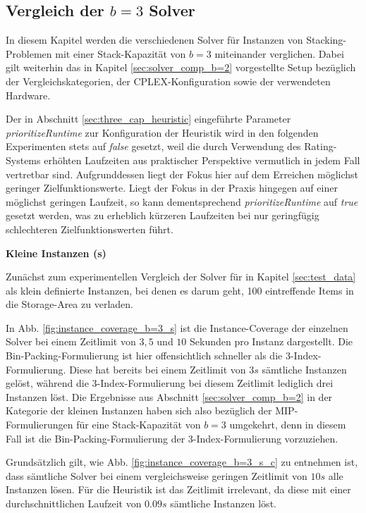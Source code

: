 \subsection{Vergleich der $b = 3$ Solver}
\label{sec:solver_comp_b=3}

In diesem Kapitel werden die verschiedenen Solver für Instanzen von Stacking-Problemen mit einer Stack-Kapazität
von $b = 3$ miteinander verglichen. Dabei gilt weiterhin das in Kapitel \ref{sec:solver_comp_b=2} vorgestellte Setup
bezüglich der Vergleichskategorien, der \textsc{CPLEX}-Konfiguration sowie der verwendeten Hardware.

Der in Abschnitt \ref{sec:three_cap_heuristic} eingeführte Parameter \textit{prioritizeRuntime} zur Konfiguration der Heuristik
wird in den folgenden Experimenten stets auf \textit{false} gesetzt, weil die durch Verwendung des Rating-Systems erhöhten Laufzeiten
aus praktischer Perspektive vermutlich in jedem Fall vertretbar sind. Aufgrunddessen liegt der Fokus hier auf dem Erreichen
möglichst geringer Zielfunktionswerte. Liegt der Fokus in der Praxis hingegen auf einer möglichst geringen Laufzeit, so kann dementsprechend
\textit{prioritizeRuntime} auf \textit{true} gesetzt werden, was zu erheblich kürzeren Laufzeiten bei nur geringfügig schlechteren
Zielfunktionswerten führt.

\pagebreak

\textbf{Kleine Instanzen (s)}

Zunächst zum experimentellen Vergleich der Solver für in Kapitel \ref{sec:test_data} als klein definierte
Instanzen, bei denen es darum geht, 100 eintreffende Items in die Storage-Area zu verladen.

In Abb. \ref{fig:instance_coverage_b=3_s} ist die Instance-Coverage der einzelnen Solver bei einem Zeitlimit von $3, 5$
und $10$ Sekunden pro Instanz dargestellt. Die Bin-Packing-Formulierung ist hier offensichtlich schneller als die 3-Index-Formulierung.
Diese hat bereits bei einem Zeitlimit von $3s$ sämtliche Instanzen gelöst, während die 3-Index-Formulierung
bei diesem Zeitlimit lediglich drei Instanzen löst. Die Ergebnisse aus Abschnitt \ref{sec:solver_comp_b=2} in der Kategorie der kleinen
Instanzen haben sich also bezüglich der MIP-Formulierungen für eine Stack-Kapazität von $b = 3$ umgekehrt, denn in diesem Fall
ist die Bin-Packing-Formulierung der 3-Index-Formulierung vorzuziehen.

Grundsätzlich gilt, wie Abb. \ref{fig:instance_coverage_b=3_s_c} zu entnehmen ist, dass sämtliche Solver
bei einem vergleichsweise geringen Zeitlimit von $10s$ alle Instanzen lösen. Für die Heuristik ist das Zeitlimit irrelevant,
da diese mit einer durchschnittlichen Laufzeit von $0.09s$ sämtliche Instanzen löst.

